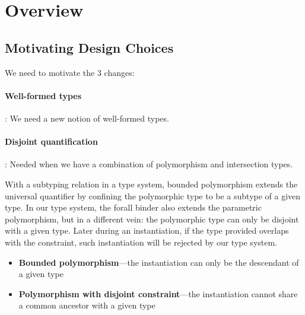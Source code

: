 \section{Overview}

\subsection{Motivating Design Choices}

We need to motivate the 3 changes:

\paragraph{Well-formed types}: We need a new notion of well-formed types.

\paragraph{Disjoint quantification}: Needed when we have a
combination of polymorphism and intersection types.

With a subtyping relation in a type system, bounded polymorphism extends the universal quantifier by confining the polymorphic type to be a subtype of a given type. In our type system, the forall binder also extends the parametric polymorphism, but in a different vein: the polymorphic type can only be disjoint with a given type. Later during an instantiation, if the type provided overlaps with the constraint, such instantiation will be rejected by our type system.

\begin{itemize}
  \item \textbf{Bounded polymorphism}---the instantiation can only be the descendant of a given type
  \item \textbf{Polymorphism with disjoint constraint}---the instantiation cannot share a common ancestor with a given type
\end{itemize}



